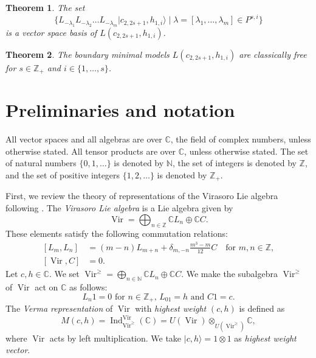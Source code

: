 \documentclass[a4paper, 12pt, reqno]{amsart}
\newtheorem{theorem}{Theorem}[section]
\theoremstyle{remark}
\DeclareMathOperator{\Vir}{Vir}
\DeclareMathOperator{\Ind}{Ind}
\begin{document}
\begin{theorem}
  \label{thr:2}
  The set
  \begin{equation*}
    \{L_{-\lambda_1}L_{-\lambda_2}\dots L_{-\lambda_m}|c_{2, 2s + 1}, h_{1, i}\rangle \mid \lambda = [\lambda_1, \dots, \lambda_m] \in P^{s, i}\}
  \end{equation*}
  is a vector space basis of $L(c_{2, 2s + 1}, h_{1, i})$.
\end{theorem}

\begin{theorem}
  \label{thr:3}
  The boundary minimal models $L(c_{2, 2s + 1}, h_{1, i})$ are classically free for $s \in \mathbb{Z}_+$ and $i \in \{1, \dots, s\}$.
\end{theorem}

\section{Preliminaries and notation}
\label{sec:prel-notat}

All vector spaces and all algebras are over $\mathbb{C}$, the field of complex numbers, unless otherwise stated.
All tensor products are over $\mathbb{C}$, unless otherwise stated.
The set of natural numbers $\{0, 1, \dots\}$ is denoted by $\mathbb{N}$, the set of integers is denoted by $\mathbb{Z}$, and the set of positive integers $\{1, 2, \dots\}$ is denoted by $\mathbb{Z}_+$.

First, we review the theory of representations of the Virasoro Lie algebra following \cite{kac_bombay_2013}.
The \emph{Virasoro Lie algebra} is a Lie algebra given by
\begin{equation*}
  \Vir = \bigoplus_{n \in \mathbb{Z}}\mathbb{C}L_n \oplus \mathbb{C}C.
\end{equation*}
These elements satisfy the following commutation relations:
\begin{equation}
  \label{eq:1}
  \begin{split}
    [L_m, L_n] &= (m - n)L_{m + n} + \delta_{m, -n}\frac{m^3 - m}{12}C \quad \text{for $m, n \in \mathbb{Z}$}, \\
    [\Vir, C] &= 0.
  \end{split}
\end{equation}
Let $c, h \in \mathbb{C}$.
We set $\Vir^{\ge} = \bigoplus_{n \in \mathbb{N}}\mathbb{C}L_n \oplus \mathbb{C}C$.
We make the subalgebra $\Vir^{\ge}$ of $\Vir$ act on $\mathbb{C}$ as follows:
\begin{equation*}
  \text{$L_n1 = 0$ for $n \in \mathbb{Z}_+$, $L_01 = h$ and $C1 = c$}.
\end{equation*}
The \emph{Verma representation} of $\Vir$ with \emph{highest weight} $(c, h)$ is defined as
\begin{equation*}
  M(c, h) = \Ind^{\Vir}_{\Vir^{\ge}}(\mathbb{C}) = U(\Vir) \otimes_{U(\Vir^{\ge})} \mathbb{C},
\end{equation*}
where $\Vir$ acts by left multiplication.
We take $|c, h\rangle = 1 \otimes 1$ as \emph{highest weight vector}.
\end{document}
